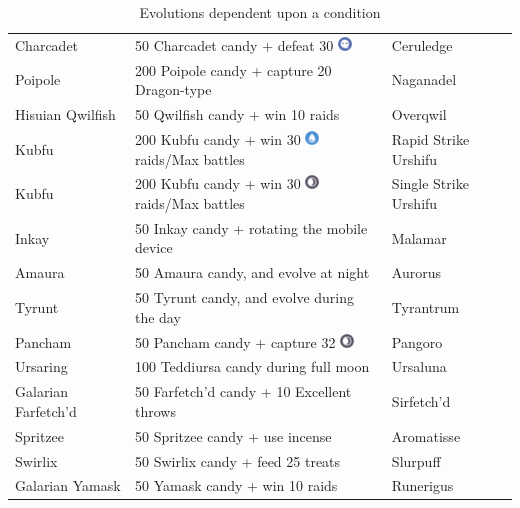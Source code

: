 \begin{table}
\begin{tabular}{lll}
  Charcadet	& 50 Charcadet candy + defeat 30 \includegraphics[width=1em,height=1em]{images/ghost.png}& Ceruledge\\
  Poipole & 200 Poipole candy + capture 20 Dragon-type & Naganadel\\
  Hisuian Qwilfish & 50 Qwilfish candy + win 10 raids & Overqwil\\
  Kubfu	& 200 Kubfu candy + win 30 \includegraphics[width=1em,height=1em]{images/water.png} raids/Max battles & Rapid Strike Urshifu\\
  Kubfu	& 200 Kubfu candy + win 30 \includegraphics[width=1em,height=1em]{images/dark.png} raids/Max battles & Single Strike Urshifu\\
  Inkay	& 50 Inkay candy + rotating the mobile device & Malamar\\
  Amaura & 50 Amaura candy, and evolve at night & Aurorus\\
  Tyrunt & 50 Tyrunt candy, and evolve during the day & Tyrantrum\\
  Pancham	& 50 Pancham candy + capture 32 \includegraphics[width=1em,height=1em]{images/dark.png} & Pangoro\\
  Ursaring & 100 Teddiursa candy during full moon & Ursaluna\\
  Galarian Farfetch'd & 50 Farfetch'd candy + 10 Excellent throws & Sirfetch'd \\
  Spritzee & 50 Spritzee candy + use incense & Aromatisse\\
  Swirlix & 50 Swirlix candy + feed 25 treats & Slurpuff\\
  Galarian Yamask & 50 Yamask candy + win 10 raids & Runerigus\\
\end{tabular}
\caption{Evolutions dependent upon a condition}
\label{table:condevolutions}
\end{table}
